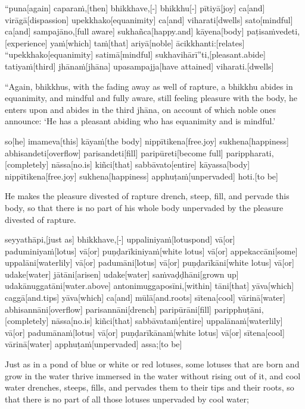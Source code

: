 \vskip 0.2in
\begin{samepage}
\begingl[glneveryline={\PaliGlossA,\PaliGlossB}]
“puna[again] caparaṁ,[then] bhikkhave,[-] bhikkhu[-] pītiyā[joy] ca[and] virāgā[dispassion] upekkhako[equanimity] ca[and] viharati[dwells] sato[mindful] ca[and] sampajāno,[full aware] sukhañca[happy.and] kāyena[body] paṭisaṁvedeti,[experience] yaṁ[which] taṁ[that] ariyā[noble] ācikkhanti:[relates] “upekkhako[equanimity] satimā[mindful] sukhavihārī”ti,[pleasant.abide] tatiyaṁ[third] jhānaṁ[jhāna] upasampajja[have attained] viharati.[dwells]
\endgl
\nopagebreak
\linespread{0.5}
\begin{spacin}{0.2}
{\PaliGlossFT “Again, bhikkhus, with the fading away as well of rapture, a bhikkhu abides in equanimity, and mindful and fully aware, still feeling pleasure with the body, he enters upon and abides in the third jhāna, on account of which noble ones announce: ‘He has a pleasant abiding who has equanimity and is mindful.’}
\end{spacin}
\vskip 12pt
\end{samepage}
\begin{samepage}
\begingl[glneveryline={\PaliGlossA,\PaliGlossB}]
so[he] imameva[this] kāyaṁ[the body] nippītikena[free.joy] sukhena[happiness] abhisandeti[overflow] parisandeti[fill] paripūreti[become full] parippharati,[completely] nāssa[no.is] kiñci[that] sabbāvato[entire] kāyassa[body] nippītikena[free.joy] sukhena[happiness] apphuṭaṁ[unpervaded] hoti.[to be]
\endgl
\nopagebreak
\linespread{0.5}
\begin{spacin}{0.2}
{\PaliGlossFT He makes the pleasure divested of rapture drench, steep, fill, and pervade this body, so that there is no part of his whole body unpervaded by the pleasure divested of rapture.}
\end{spacin}
\vskip 12pt
\end{samepage}
\begin{samepage}
\begingl[glneveryline={\PaliGlossA,\PaliGlossB}]
seyyathāpi,[just as] bhikkhave,[-] uppaliniyaṁ[lotuspond] vā[or] paduminiyaṁ[lotus] vā[or] puṇḍarīkiniyaṁ[white lotus] vā[or] appekaccāni[some] uppalāni[waterlily] vā[or] padumāni[lotus] vā[or] puṇḍarīkāni[white lotus] vā[or] udake[water] jātāni[arisen] udake[water] saṁvaḍḍhāni[grown up] udakānuggatāni[water.above] antonimuggaposīni,[within] tāni[that] yāva[which] caggā[and.tips] yāva[which] ca[and] mūlā[and.roots] sītena[cool] vārinā[water] abhisannāni[overflow] parisannāni[drench] paripūrāni[fill] paripphuṭāni,[completely] nāssa[no.is] kiñci[that] sabbāvataṁ[entire] uppalānaṁ[waterlily] vā[or] padumānaṁ[lotus] vā[or] puṇḍarīkānaṁ[white lotus] vā[or] sītena[cool] vārinā[water] apphuṭaṁ[unpervaded] assa;[to be]
\endgl
\nopagebreak
\linespread{0.5}
\begin{spacin}{0.2}
{\PaliGlossFT Just as in a pond of blue or white or red lotuses, some lotuses that are born and grow in the water thrive immersed in the water without rising out of it, and cool water drenches, steeps, fills, and pervades them to their tips and their roots, so that there is no part of all those lotuses unpervaded by cool water;}
\end{spacin}
\vskip 12pt
\end{samepage}
